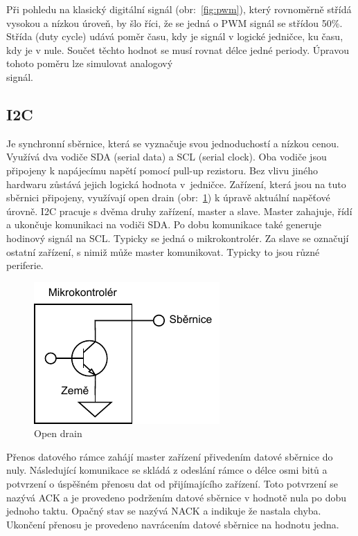 \newpage
Při pohledu na klasický digitální signál (obr:~\ref{fig:pwm}), který rovnoměrně střídá vysokou a nízkou úroveň, by šlo říci, že se jedná o PWM signál se střídou 50\%. Střída (duty cycle) udává poměr času, kdy je signál v logické jedničce, ku času, kdy je v nule. Součet těchto hodnot se musí rovnat délce jedné periody. Úpravou tohoto poměru lze simulovat analogový \\ signál.~\cite[str:~116-118]{embeded_robotics}

\subsection*{I2C}
Je synchronní sběrnice, která se vyznačuje svou jednoduchostí a nízkou cenou. Využívá dva vodiče SDA (serial data) a SCL (serial clock). Oba vodiče jsou připojeny k napájecímu napětí pomocí pull-up rezistoru. Bez vlivu jiného hardwaru zůstává jejich logická hodnota v~jedničce. Zařízení, která jsou na tuto sběrnici připojeny, využívají open drain (obr:~\ref{fig:open_drain}) k úpravě aktuální napěťové úrovně. I2C pracuje s dvěma druhy zařízení, master a slave. Master zahajuje, řídí a ukončuje komunikaci na vodiči SDA. Po dobu komunikace také generuje hodinový signál na SCL. Typicky se jedná o mikrokontrolér. Za slave se označují ostatní zařízení, s nimiž může master komunikovat. Typicky to jsou různé periferie. \cite[str:~88]{embeded_robotics}

\begin{figure}[h!]
	\centering
	\includegraphics[scale=1]{obrazky-figures/open_drain.pdf}
	\caption{Open drain}
	\label{fig:open_drain}
\end{figure}

Přenos datového rámce zahájí master zařízení přivedením datové sběrnice do nuly. Následující komunikace se skládá z odeslání rámce o délce osmi bitů a potvrzení o úspěšném přenosu dat od přijímajícího zařízení. Toto potvrzení se nazývá ACK a je provedeno podržením datové sběrnice v hodnotě nula po dobu jednoho taktu. Opačný stav se nazývá NACK a indikuje že nastala chyba. Ukončení přenosu je provedeno navrácením datové sběrnice na hodnotu jedna. \cite[str:~8-10]{um10204}

